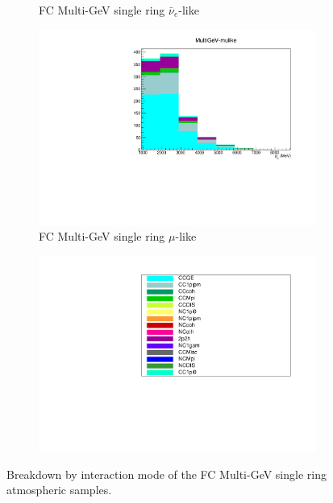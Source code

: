 \begin{figure}[ht]
\begin{subfigure}[t]{0.49\textwidth}
    \caption{FC Multi-GeV single ring $\bar{\nu}_e$-like}
    \end{subfigure}
    \begin{subfigure}[t]{0.49\textwidth}
    \includegraphics[width=\textwidth, trim= 0 0 0 30, clip]{Figures/Selections/AtmosphericByMode/MultiGeV-mulike_LepMom.pdf}
    \caption{FC Multi-GeV single ring $\mu$-like}
    \end{subfigure}
    \begin{subfigure}[t]{0.49\textwidth}
    \includegraphics[page=1,width=\textwidth, trim= 0 0 0 30, clip]{Figures/Selections/AtmosphericByMode/Legend.pdf}
    \end{subfigure}

    \caption{Breakdown by interaction mode of the FC Multi-GeV single ring atmospheric samples.}
    \label{fig:SKSamples:FCMultiGeV}
\end{figure}

